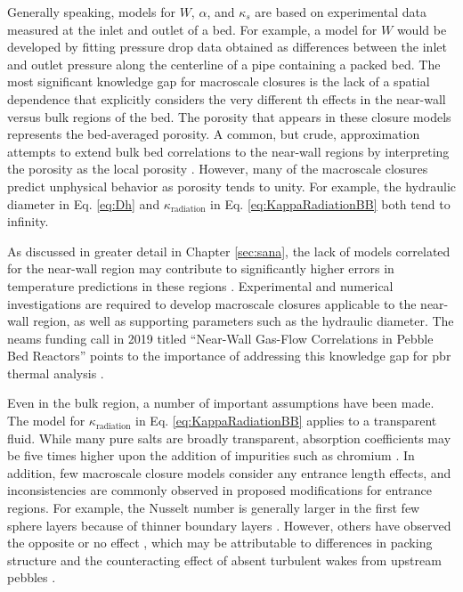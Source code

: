 Generally speaking, models for \(W\), \(\alpha\), and \(\kappa_s\) are based on experimental data measured at the inlet and outlet of a bed. For example, a model for \(W\) would be developed by fitting pressure drop data obtained as differences between the inlet and outlet pressure along the centerline of a pipe containing a packed bed. The most significant knowledge gap for macroscale closures is the lack of a spatial dependence that explicitly considers the very different \gls{th} effects in the near-wall versus bulk regions of the bed. The porosity that appears in these closure models represents the bed-averaged porosity. A common, but crude, approximation attempts to extend bulk bed correlations to the near-wall regions by interpreting the porosity as the local porosity \cite{kaviany, vortmeyer, giese, vafai}. However, many of the macroscale closures predict unphysical behavior as porosity tends to unity. For example, the hydraulic diameter in Eq. \eqref{eq:Dh} and \(\kappa_\text{radiation}\) in Eq. \eqref{eq:KappaRadiationBB} both tend to infinity.

As discussed in greater detail in Chapter \ref{sec:sana}, the lack of models correlated for the near-wall region may contribute to significantly higher errors in temperature predictions in these regions \cite{novak_2019}. Experimental and numerical investigations are required to develop macroscale closures applicable to the near-wall region, as well as supporting parameters such as the hydraulic diameter. The \gls{neams} funding call in 2019 titled ``Near-Wall Gas-Flow Correlations in Pebble Bed Reactors'' points to the importance of addressing this knowledge gap for \gls{pbr} thermal analysis \cite{neams2}. 

Even in the bulk region, a number of important assumptions have been made. The model for \(\kappa_\text{radiation}\) in Eq. \eqref{eq:KappaRadiationBB} applies to a transparent fluid. While many pure salts are broadly transparent, absorption coefficients may be five times higher upon the addition of impurities such as chromium \cite{chaleff}. In addition, few macroscale closure models consider any entrance length effects, and inconsistencies are commonly observed in proposed modifications for entrance regions. For example, the Nusselt number is generally larger in the first few sphere layers because of thinner boundary layers \cite{ferng,song}. However, others have observed the opposite \cite{KTAhtc} or no effect \cite{song}, which may be attributable to differences in packing structure and the counteracting effect of absent turbulent wakes from upstream pebbles \cite{achenbach}. 

